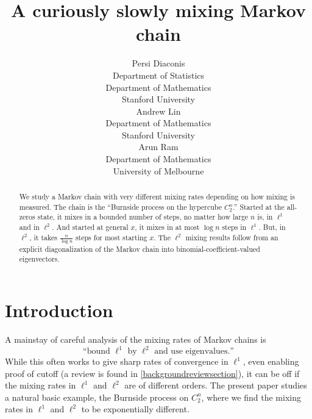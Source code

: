 \documentclass[11pt]{article}
\title{A curiously slowly mixing Markov chain}
\author{
\begin{tabular}{c} Persi Diaconis\\ \small Department of Statistics \\ [-3pt] \small Department of Mathematics \\ [-3pt]\small Stanford University\end{tabular}
\begin{tabular}{c} Andrew Lin\\ \small Department of Mathematics \\ [-3pt]\small Stanford University\end{tabular}
\begin{tabular}{c} Arun Ram\\ \small Department of Mathematics \\ [-3pt]\small University of Melbourne\end{tabular}
}
\date{}
\newcounter{r}
\newcounter{s}
\numberwithin{equation}{section}
\begin{document}
 

\maketitle

\begin{abstract}
We study a Markov chain with very different mixing rates depending on how mixing is measured. The chain is the ``Burnside process on the hypercube $C_2^n$.'' Started at the all-zeros state, it mixes in a bounded number of steps, no matter how large $n$ is, in $\ell^1$ and in $\ell^2$. And started at general $x$, it mixes in at most $\log n$ steps in $\ell^1$. But, in $\ell^2$, it takes $\frac{n}{\log n}$ steps for most starting $x$. The $\ell^2$ mixing results follow from an explicit diagonalization of the Markov chain into binomial-coefficient-valued eigenvectors.
\end{abstract}

\tableofcontents

\section{Introduction}

A mainstay of careful analysis of the mixing rates of Markov chains is
\[
    \text{``bound }\ell^1 \text{ by }\ell^2 \text{ and use eigenvalues.''}
\]
While this often works to give sharp rates of convergence in $\ell^1$, even enabling proof of cutoff (a review is found in \cref{backgroundreviewsection}), it can be off if the mixing rates in $\ell^1$ and $\ell^2$ are of different orders. The present paper studies a natural basic example, the Burnside process on $C_2^n$, where we find the mixing rates in $\ell^1$ and $\ell^2$ to be exponentially different.
\end{document}
